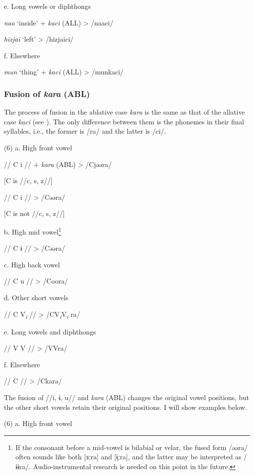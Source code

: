   e.  Long vowels or diphthongs  

    \textit{naa}  ‘inside’  +  \textit{kaci} (ALL)  >  /naaci/  

    \textit{hizjai}  ‘left’      >  /hizjaici/  

  f.  Elsewhere

    \textit{mun}  ‘thing’  +  \textit{kaci} (ALL)  >  /munkaci/  

\subsubsection{Fusion of \textit{kara} (ABL)}
\label{bkm:Ref365151812}
The process of fusion in the ablative case \textit{kara} is the same as that of the allative case \textit{kaci} (see ). The only difference between them is the phonemes in their final syllables, i.e., the former is /ra/ and the latter is /ci/.

(6)  a.  High front vowel

    //  C  i  //  +  \textit{kara} (ABL)  >  /Cjəəra/

    [C is //c, s, z//]

    //  C  i  //      >  /Cəəra/

    [C is not //c, s, z//]

  b.  High mid vowel\footnote{If the consonant before a mid-vowel is bilabial or velar, the fused form /əəra/ often sounds like both [ɜːra] and [ɨ̞ːra], and the latter may be interpreted as /ɨɨra/. Audio-instrumental research is needed on this point in the future.}

    //  C  ɨ  //      >  /Cəəra/

  c.  High back vowel

    //  C  u  //      >  /Coora/

  d.  Other short vowels

    //  C  V\textit{\textsubscript{i}}  //      >  /CV\textit{\textsubscript{i}}V\textit{\textsubscript{i} }ra/

  e.  Long vowels and diphthongs

    //  V  V  //      >  /VVra/

  f.  Elsewhere

    //  C  //        >  /Ckara/

The fusion of //i, ɨ, u// and \textit{kara} (ABL) changes the original vowel positions, but the other short vowels retain their original positions. I will show examples below.

(6)  a.  High front vowel  

